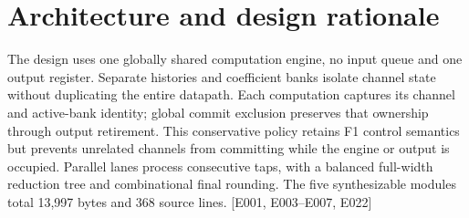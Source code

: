 \documentclass[11pt,a4paper]{article}
\begin{document}
\section{Architecture and design rationale}

The design uses one globally shared computation engine,\allowbreak{} no input queue and one output register. Separate histories and coefficient banks isolate channel state without duplicating the entire datapath. Each computation captures its channel and active-bank identity; global commit exclusion preserves that ownership through output retirement. This conservative policy retains F1 control semantics but prevents unrelated channels from committing while the engine or output is occupied. Parallel lanes process consecutive taps,\allowbreak{} with a balanced full-width reduction tree and combinational final rounding. The five synthesizable modules total 13,\allowbreak{}997 bytes and 368 source lines. [\allowbreak{}E001,\allowbreak{} E003–E007,\allowbreak{} E022]\allowbreak{}
\end{document}
